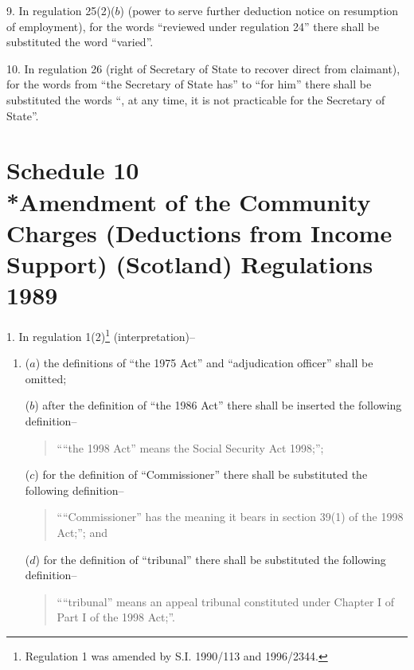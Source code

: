 \documentclass[12pt,a4paper]{article}
\begin{document}
\medskip

9.  In regulation 25(2)($b$)  (power to serve further deduction notice on resumption of employment), for the words “reviewed under regulation 24” there shall be substituted the word “varied”.

\medskip

10.  In regulation 26 (right of Secretary of State to recover direct from claimant), for the words from “the Secretary of State has” to “for him” there shall be substituted the words “, at any time, it is not practicable for the Secretary of State”.

\part[Schedule 10 --- Amendment of the Community Charges (Deductions from Income Support) (Scotland) Regulations 1989]{Schedule 10\\*Amendment of the Community Charges (Deductions from Income Support) (Scotland) Regulations 1989}

\renewcommand\parthead{--- Schedule 10}

1.  In regulation 1(2)\footnote{\frenchspacing Regulation 1 was amended by S.I. 1990/113 and 1996/2344.} (interpretation)–
\begin{enumerate}\item[]
($a$) the definitions of “the 1975 Act” and “adjudication officer” shall be omitted;

($b$) after the definition of “the 1986 Act” there shall be inserted the following definition–
\begin{quotation}
““the 1998 Act” means the Social Security Act 1998;”;
\end{quotation}

($c$) for the definition of “Commissioner” there shall be substituted the following definition–
\begin{quotation}
    ““Commissioner” has the meaning it bears in section 39(1) of the 1998 Act;”; and 
\end{quotation}

($d$) for the definition of “tribunal” there shall be substituted the following definition–
\begin{quotation}
““tribunal” means an appeal tribunal constituted under Chapter I of Part I of the 1998 Act;”.
\end{quotation}
\end{enumerate}

\medskip
\end{document}
